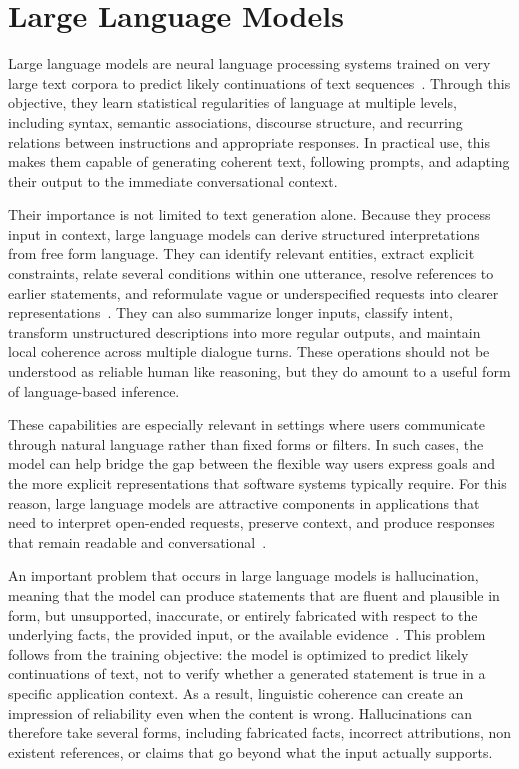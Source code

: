 \section{Large Language Models}\label{section:background:large-language-models}
Large language models are neural language processing systems trained on very large text corpora to predict likely continuations of text sequences~\parencite{zhaoSurveyLLM}. Through this objective, they learn statistical regularities of language at multiple levels, including syntax, semantic associations, discourse structure, and recurring relations between instructions and appropriate responses. In practical use, this makes them capable of generating coherent text, following prompts, and adapting their output to the immediate conversational context.

Their importance is not limited to text generation alone. Because they process input in context, large language models can derive structured interpretations from free form language. They can identify relevant entities, extract explicit constraints, relate several conditions within one utterance, resolve references to earlier statements, and reformulate vague or underspecified requests into clearer representations~\parencite{zhaoSurveyLLM}. They can also summarize longer inputs, classify intent, transform unstructured descriptions into more regular outputs, and maintain local coherence across multiple dialogue turns. These operations should not be understood as reliable human like reasoning, but they do amount to a useful form of language-based inference.

These capabilities are especially relevant in settings where users communicate through natural language rather than fixed forms or filters. In such cases, the model can help bridge the gap between the flexible way users express goals and the more explicit representations that software systems typically require. For this reason, large language models are attractive components in applications that need to interpret open-ended requests, preserve context, and produce responses that remain readable and conversational~\parencite{aliannejadiGenerativeIRInteractions}.

An important problem that occurs in large language models is hallucination, meaning that the model can produce statements that are fluent and plausible in form, but unsupported, inaccurate, or entirely fabricated with respect to the underlying facts, the provided input, or the available evidence~\parencite{zhaoSurveyLLM,gaoRagSurvey}. This problem follows from the training objective: the model is optimized to predict likely continuations of text, not to verify whether a generated statement is true in a specific application context. As a result, linguistic coherence can create an impression of reliability even when the content is wrong. Hallucinations can therefore take several forms, including fabricated facts, incorrect attributions, non existent references, or claims that go beyond what the input actually supports.


